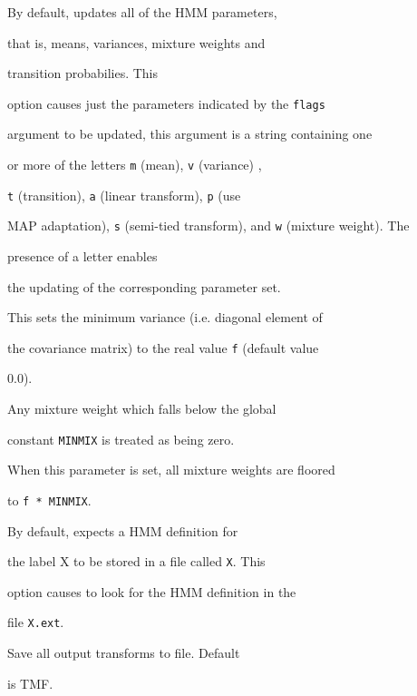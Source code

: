 \begin{optlist}
   By default,  updates all of the HMM parameters,


      that is, means, variances, mixture weights and 


      transition probabilies. This 


      option causes just the parameters indicated by the {\tt flags}


      argument to be updated, this argument is a string containing one


      or more of the letters {\tt m} (mean), {\tt v} (variance) ,


      {\tt t} (transition), {\tt a} (linear transform), {\tt p} (use 


	MAP adaptation), {\tt s} (semi-tied transform), and {\tt w} (mixture weight).  The 


      presence of a letter enables


      the updating of the corresponding parameter set.





    This sets the minimum variance (i.e. diagonal element of


      the covariance matrix) to the real value {\tt f} (default value


      0.0).





    Any mixture weight which falls below the global


            constant {\tt MINMIX} is treated as being zero.


      When this parameter is  set,  all mixture weights  are floored


      to {\tt f * MINMIX}.


      


    By default,  expects a HMM definition for 


      the label X to be stored in a file called {\tt X}.  This


      option causes  to look for the HMM definition in the


      file {\tt X.ext}.





   Save all output transforms to file. Default


	is TMF.






\end{optlist}
